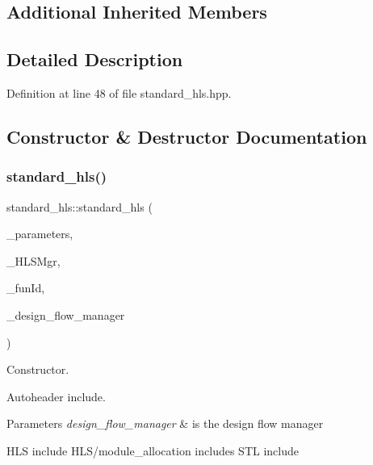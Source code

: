 \subsection*{Additional Inherited Members}


\subsection{Detailed Description}


Definition at line 48 of file standard\+\_\+hls.\+hpp.



\subsection{Constructor \& Destructor Documentation}
\mbox{\label{classstandard__hls_aaf82a542e4a533eda425fbc186971954}} 
\subsubsection{\texorpdfstring{standard\+\_\+hls()}{standard\_hls()}}
{\footnotesize\ttfamily standard\+\_\+hls\+::standard\+\_\+hls (\begin{DoxyParamCaption}\item[{const \hyperlink{Parameter_8hpp_a37841774a6fcb479b597fdf8955eb4ea}{Parameter\+Const\+Ref}}]{\+\_\+parameters,  }\item[{const \hyperlink{hls__manager_8hpp_acd3842b8589fe52c08fc0b2fcc813bfe}{H\+L\+S\+\_\+manager\+Ref}}]{\+\_\+\+H\+L\+S\+Mgr,  }\item[{unsigned int}]{\+\_\+fun\+Id,  }\item[{const Design\+Flow\+Manager\+Const\+Ref}]{\+\_\+design\+\_\+flow\+\_\+manager }\end{DoxyParamCaption})}



Constructor. 

Autoheader include.


\begin{DoxyParams}{Parameters}
{\em design\+\_\+flow\+\_\+manager} & is the design flow manager\\
\hline
\end{DoxyParams}
H\+LS include H\+L\+S/module\+\_\+allocation includes S\+TL include 

